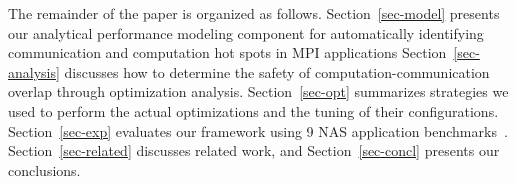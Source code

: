 The remainder of the paper is organized as follows.
Section~\ref{sec-model} presents our analytical performance modeling
component for automatically identifying communication and computation
hot spots in MPI applications Section~\ref{sec-analysis} discusses how
to determine the safety of computation-communication overlap through
optimization analysis.  Section~\ref{sec-opt} summarizes strategies we
used to perform the actual optimizations and the tuning of their
configurations.  Section~\ref{sec-exp} evaluates our framework using 9
NAS application benchmarks~\cite{npb}.  Section~\ref{sec-related}
discusses related work, and Section~\ref{sec-concl} presents our
conclusions.
